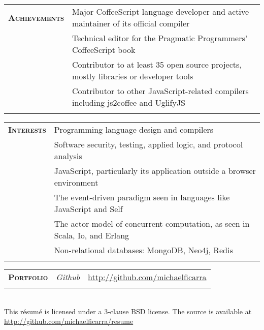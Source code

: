 \documentclass{report}
\newcommand{\sectiontitle}[1]{{\large \textsc{\textbf{#1}}}}
\newcommand{\gutterwidth}[0]{3.3cm}
\newcommand{\extralinespacing}[0]{0.15cm}
\begin{document}
\begin{tabular}{@{}p{\gutterwidth}p{13cm}@{}}
  \sectiontitle{Achievements}
     & Major CoffeeScript language developer and active maintainer of its official compiler \\[\extralinespacing]
  {} & Technical editor for the Pragmatic Programmers' CoffeeScript book \\[\extralinespacing]
  {} & Contributor to at least 35 open source projects, mostly libraries or developer tools \\[\extralinespacing]
  {} & Contributor to other JavaScript-related compilers including js2coffee and UglifyJS \\
  \\
\end{tabular}

\begin{tabular}{@{}p{\gutterwidth}p{13cm}@{}}
  \sectiontitle{Interests}
      &  Programming language design and compilers \\[\extralinespacing]
  {}  &  Software security, testing, applied logic, and protocol analysis \\[\extralinespacing]
  {}  &  JavaScript, particularly its application outside a browser environment \\[\extralinespacing]
  {}  &  The event-driven paradigm seen in languages like JavaScript and Self \\[\extralinespacing]
  {}  &  The actor model of concurrent computation, as seen in Scala, Io, and Erlang \\[\extralinespacing]
  {}  &  Non-relational databases: MongoDB, Neo4j, Redis \\
  \\
\end{tabular}

\begin{tabular}{@{}p{\gutterwidth}p{1.5cm}p{11.5cm}@{}}
  \sectiontitle{Portfolio}  &  {\em Github}  &  \url{http://github.com/michaelficarra} \\
  \\
\end{tabular}

\begin{center} {\footnotesize~\\
  This r\'{e}sum\'{e} is licensed under a 3-clause BSD license. The source is available at \url{http://github.com/michaelficarra/resume}
} \end{center}
\end{document}
